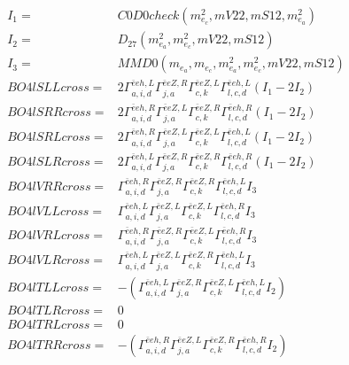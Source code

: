\documentclass[A4,landscape]{article}
\begin{document}
\begin{align} 
I_1 = & C0D0check(m^2_{e_{{c}}}, mV22, mS12, m^2_{e_{{a}}}) \\ 
I_2 = & D_{27}(m^2_{e_{{a}}}, m^2_{e_{{c}}}, mV22, mS12) \\ 
I_3 = & MMD0(m_{e_{{a}}}, m_{e_{{c}}}, m^2_{e_{{a}}}, m^2_{e_{{c}}}, mV22, mS12) \\ 
  BO4lSLLcross= & 2  \Gamma^{\bar{e}e h ,L}_{a, i, d} \Gamma^{\bar{e}e Z ,R}_{j, a} \Gamma^{\bar{e}e Z ,L}_{c, k} \Gamma^{\bar{e}e h ,L}_{l, c, d} (I_1 - 2 I_2) \\ 
  BO4lSRRcross= & 2  \Gamma^{\bar{e}e h ,R}_{a, i, d} \Gamma^{\bar{e}e Z ,L}_{j, a} \Gamma^{\bar{e}e Z ,R}_{c, k} \Gamma^{\bar{e}e h ,R}_{l, c, d} (I_1 - 2 I_2) \\ 
  BO4lSRLcross= & 2  \Gamma^{\bar{e}e h ,R}_{a, i, d} \Gamma^{\bar{e}e Z ,L}_{j, a} \Gamma^{\bar{e}e Z ,L}_{c, k} \Gamma^{\bar{e}e h ,L}_{l, c, d} (I_1 - 2 I_2) \\ 
  BO4lSLRcross= & 2  \Gamma^{\bar{e}e h ,L}_{a, i, d} \Gamma^{\bar{e}e Z ,R}_{j, a} \Gamma^{\bar{e}e Z ,R}_{c, k} \Gamma^{\bar{e}e h ,R}_{l, c, d} (I_1 - 2 I_2) \\ 
  BO4lVRRcross= &  \Gamma^{\bar{e}e h ,R}_{a, i, d} \Gamma^{\bar{e}e Z ,R}_{j, a} \Gamma^{\bar{e}e Z ,R}_{c, k} \Gamma^{\bar{e}e h ,L}_{l, c, d} I_3 \\ 
  BO4lVLLcross= &  \Gamma^{\bar{e}e h ,L}_{a, i, d} \Gamma^{\bar{e}e Z ,L}_{j, a} \Gamma^{\bar{e}e Z ,L}_{c, k} \Gamma^{\bar{e}e h ,R}_{l, c, d} I_3 \\ 
  BO4lVRLcross= &  \Gamma^{\bar{e}e h ,R}_{a, i, d} \Gamma^{\bar{e}e Z ,R}_{j, a} \Gamma^{\bar{e}e Z ,L}_{c, k} \Gamma^{\bar{e}e h ,R}_{l, c, d} I_3 \\ 
  BO4lVLRcross= &  \Gamma^{\bar{e}e h ,L}_{a, i, d} \Gamma^{\bar{e}e Z ,L}_{j, a} \Gamma^{\bar{e}e Z ,R}_{c, k} \Gamma^{\bar{e}e h ,L}_{l, c, d} I_3 \\ 
  BO4lTLLcross= & -( \Gamma^{\bar{e}e h ,L}_{a, i, d} \Gamma^{\bar{e}e Z ,R}_{j, a} \Gamma^{\bar{e}e Z ,L}_{c, k} \Gamma^{\bar{e}e h ,L}_{l, c, d} I_2) \\ 
  BO4lTLRcross= & 0 \\ 
  BO4lTRLcross= & 0 \\ 
  BO4lTRRcross= & -( \Gamma^{\bar{e}e h ,R}_{a, i, d} \Gamma^{\bar{e}e Z ,L}_{j, a} \Gamma^{\bar{e}e Z ,R}_{c, k} \Gamma^{\bar{e}e h ,R}_{l, c, d} I_2) \\ 
\end{align} 
\end{document}
